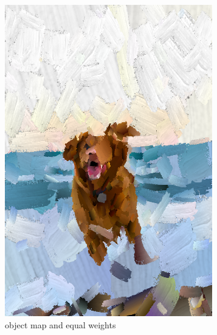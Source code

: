 \documentclass[11pt]{article}
\begin{document}
\begin{figure}[ht]
     \centering
     \begin{subfigure}[b]{0.24\textwidth}
         \centering
         \includegraphics[width=\textwidth]{final-equal.png}
         \caption{object map and equal weights}
         \label{fig:fe}
     \end{subfigure}
     \hfill
     \begin{subfigure}[b]{0.24\textwidth}
         \centering

\end{subfigure}
\end{figure}
\end{document}

